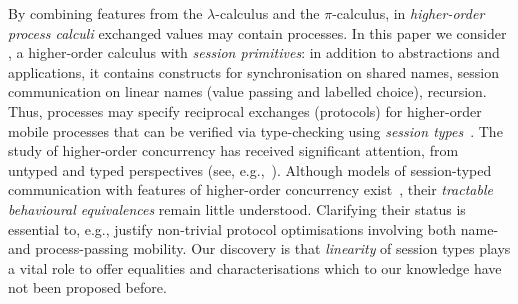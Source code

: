 \noindent
By combining features from the $\lambda$-calculus and the $\pi$-calculus, 
in \emph{higher-order process calculi} exchanged values may contain  processes. 
In this paper we consider \HOp, a higher-order calculus with \emph{session primitives}:
in addition to abstractions and applications, it 
contains constructs for 
synchronisation on shared names, 
  session communication on linear names (value passing and
labelled choice), recursion.
Thus, \HOp processes may specify reciprocal exchanges (protocols) 
for higher-order mobile processes that
 can be verified via type-checking using \emph{session types}~\cite{honda.vasconcelos.kubo:language-primitives}.
The study of higher-order concurrency has received significant attention, 
from untyped and typed perspectives (see, e.g.,~\cite{ThomsenB:plachoasgcfhop,SangiorgiD:expmpa,San96int,JeffreyR05,MostrousY15,DBLP:journals/iandc/LanesePSS11,DBLP:conf/icalp/LanesePSS10,DBLP:conf/esop/KoutavasH11,XuActa2012}).
Although models of session-typed 
communication with features of higher-order concurrency exist~\cite{tlca07,DBLP:journals/jfp/GayV10},
their  \emph{tractable behavioural equivalences} 
remain little understood. 
Clarifying their status is essential to, e.g., 
justify non-trivial protocol optimisations involving both name- and process-passing mobility.
Our discovery is that \emph{linearity} of session types plays a vital role to 
offer equalities and characterisations
which to our knowledge have not been proposed before.   

